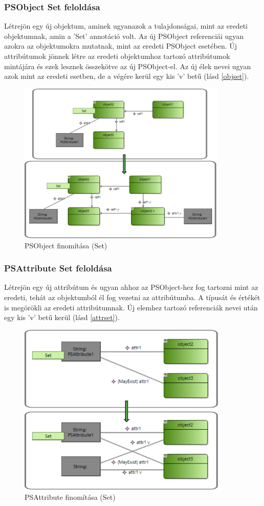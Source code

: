 \subsubsection{PSObject Set feloldása}
Létrejön egy új objektum, aminek ugyanazok a tulajdonságai, mint az eredeti objektumnak, amin a 'Set' annotáció volt. Az új PSObject referenciái ugyan azokra az objektumokra mutatnak, mint az eredeti PSObject esetében. Új attribútumok jönnek létre az eredeti objektumhoz tartozó attribútumok mintájára és ezek lesznek összekötve az új PSObject-el. Az új élek nevei ugyan azok mint az eredeti esetben, de a végére kerül egy kis 'v' betű (lásd \autoref{objset}).
\begin{figure}[!ht]
	\centering
	\includegraphics[width=100mm]{figures/objset.pdf}
	\caption{PSObject finomítása (Set)}
	\label{objset} 
\end{figure}

\subsubsection{PSAttribute Set feloldása}
Létrejön egy új attribútum és ugyan ahhoz az PSObject-hez fog tartozni mint az eredeti,  tehát az objektumból él fog vezetni az attribútumba. A típusát és értékét is megörökli az eredeti attribútumnak. Új elemhez tartozó referenciák nevei után egy kis 'v' betű kerül (lásd \autoref{attrset}).
\begin{figure}[!ht]
	\centering
	\includegraphics[width=100mm]{figures/attrset.pdf}
	\caption{PSAttribute finomítása (Set)}
	\label{attrset} 
\end{figure}

